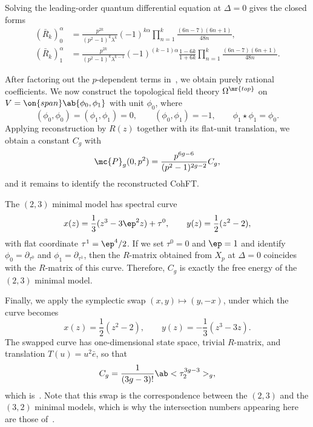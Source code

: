 \begin{lem}%
\label{lem:R matrix at Delta zero}
    Solving the leading-order quantum differential equation at \(\Delta = 0\) gives the closed forms
    \begin{align*}
        (\bar{R}_k)_0^{\alpha} &= \frac{p^{2k}}{(p^2-1)^k\lambda^k}(-1)^{k\alpha}\prod_{n=1}^k \frac{(6n-7)(6n+1)}{48n}, \\
        (\bar{R}_k)_1^{\alpha} &= \frac{p^{2k}}{(p^2-1)^k \lambda^{k-1}}(-1)^{(k-1)\alpha}\frac{1-6k}{1+6k}\prod_{n=1}^k \frac{(6n-7)(6n+1)}{48n}.
    \end{align*}
\end{lem}

After factoring out the \(p\)-dependent terms in~, we obtain purely rational coefficients. We now construct the topological field theory \(\Omega^{\mr{top}}\) on \(V = \on{span}\ab\{\phi_0,\phi_1\}\) with unit \(\phi_0\), where
\[ (\phi_0,\phi_0) = (\phi_1,\phi_1) = 0, \qquad (\phi_0,\phi_1) = -1, \qquad \phi_1 \star \phi_1 = \phi_0. \]
Applying reconstruction by \(R(z)\) together with its flat-unit translation, we obtain a constant \(C_g\) with
\[ \mc{P}_g(0,p^2) = \frac{p^{6g-6}}{(p^2-1)^{2g-2}}C_g, \]
and it remains to identify the reconstructed CohFT.

The \((2,3)\) minimal model has spectral curve
\[ x(z) = \frac{1}{3}(z^3-3\ep^2 z) + \tau^0, \qquad y(z) = \frac{1}{2}(z^2-2), \]
with flat coordinate \(\tau^1 = \ep^4/2\). If we set \(\tau^0 = 0\) and \(\ep = 1\) and identify \(\phi_0 = \partial_{\tau^0}\) and \(\phi_1 = \partial_{\tau^1}\), then the \(R\)-matrix obtained from \(X_p\) at \(\Delta = 0\) coincides with the \(R\)-matrix of this curve. Therefore, \(C_g\) is exactly the free energy of the \((2,3)\) minimal model.

Finally, we apply the symplectic swap \((x,y) \mapsto (y,-x)\), under which the curve becomes
\[ x(z) = \frac{1}{2}(z^2-2), \qquad y(z) = -\frac{1}{3}(z^3-3z). \]
The swapped curve has one-dimensional state space, trivial \(R\)-matrix, and translation \(T(u) = u^2 \bar{e}\), so that
\[ C_g = \frac{1}{(3g-3)!}\ab<\tau_2^{3g-3}>_g, \]
which is~. Note that this swap is the correspondence between the \((2,3)\) and the \((3,2)\) minimal models, which is why the intersection numbers appearing here are those of~.


